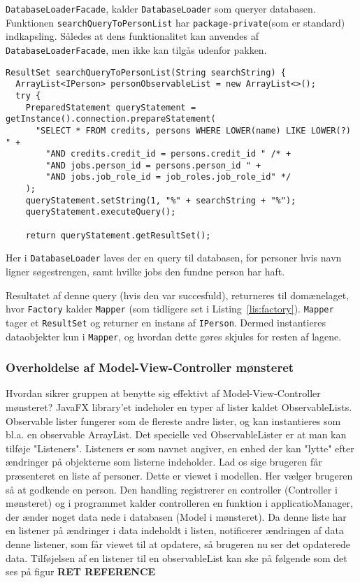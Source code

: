 \texttt{DatabaseLoaderFacade}, kalder \texttt{DatabaseLoader} som queryer
databasen. Funktionen \texttt{searchQueryToPersonList} har
\texttt{package-private}(som er standard) indkapsling. Således at dens
funktionalitet kan anvendes af \texttt{DatabaseLoaderFacade}, men ikke kan
tilgås udenfor pakken. 

\begin{lstlisting}[basicstyle=\ttfamily\footnotesize, firstnumber=42,
caption=Query af databasen for personer (\texttt{DatabaseLoader.java})]
ResultSet searchQueryToPersonList(String searchString) {
  ArrayList<IPerson> personObservableList = new ArrayList<>();
  try {
    PreparedStatement queryStatement = getInstance().connection.prepareStatement(
      "SELECT * FROM credits, persons WHERE LOWER(name) LIKE LOWER(?) " +
        "AND credits.credit_id = persons.credit_id " /* +
        "AND jobs.person_id = persons.person_id " +
        "AND jobs.job_role_id = job_roles.job_role_id" */
    );
    queryStatement.setString(1, "%" + searchString + "%");
    queryStatement.executeQuery();

    return queryStatement.getResultSet();
\end{lstlisting}

Her i \texttt{DatabaseLoader} laves der en query til databasen, for personer
hvis navn ligner søgestrengen, samt hvilke jobs den fundne person har haft.

Resultatet af denne query (hvis den var succesfuld), returneres til domænelaget,
hvor \texttt{Factory} kalder \texttt{Mapper} (som tidligere set i
Listing~\ref{lis:factory}). \texttt{Mapper} tager et \texttt{ResultSet} og
returner en instans af \texttt{IPerson}. Dermed instantieres dataobjekter kun i
\texttt{Mapper}, og hvordan dette gøres skjules for resten af lagene.

\subsubsection{Overholdelse af Model-View-Controller mønsteret} Hvordan sikrer gruppen at benytte sig effektivt af Model-View-Controller mønsteret? 
JavaFX library'et indeholer en typer af lister kaldet ObservableLists.
Observable lister fungerer som de flereste andre lister, og kan instantieres som
bl.a. en observable ArrayList. Det specielle ved ObservableLister er at man kan
tilføje "Listeners". Listeners er som navnet angiver, en enhed der kan "lytte"
efter ændringer på objekterne som listerne indeholder. Lad os sige brugeren får
præsenteret en liste af personer. Dette er viewet i modellen. Her vælger
brugeren så at godkende en person. Den handling registrerer en controller
(Controller i mønsteret) og i programmet kalder controlleren en funktion i
applicatioManager, der ænder noget data nede i databasen (Model i mønsteret). Da
denne liste har en listener på ændringer i data indeholdt i listen, notificerer
ændringen af data denne listener, som får viewet til at opdatere, så brugeren nu
ser det opdaterede data.  Tilføjelsen af en listener til en observableList kan
ske på følgende som det ses på figur \textbf{RET REFERENCE}

